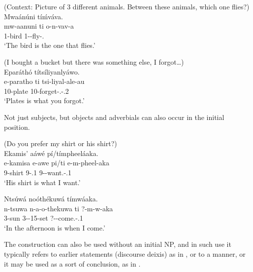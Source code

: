 \documentclass[output=paper]{langscibook}
\begin{document}
\ea
\label{bkm:Ref110413319}
(Context: Picture of 3 different animals. Between these animals, which one flies?)\\
Mwaánúni tí\'{m}váva.\\
\gll
mw-aanuni  ti  o-n-vav-a\\
1-bird  \COP{}  1{}-\PRS{}-fly-\FV{}.\REL{}\\
\glt
‘The bird is the one that flies.’\\


\z

\ea
\label{bkm:Ref110495426}
(I bought a bucket but there was something else, I forgot…)\\
Eparáthó títsíliyanlyáwo.\\
\gll
e-paratho  ti  tsi-liyal-ale-au\\
10-plate  \COP{}  10-forget-\PFV{}.\REL{}-\POSS{}.2\SG{}\\
\glt
‘Plates is what you forgot.’\\


\z

Not just subjects, but objects  and adverbials  can also occur in the initial position.


\ea
\label{bkm:Ref96779105}
(Do you prefer my shirt or his shirt?)\\
Ekamis' aáwé pí/tímpheeláaka.\\
\gll
e-kamisa  e-awe  pi/ti  e-m-pheel-aka\\
9-shirt  9-\POSS{}.1  \COP{}  9-\PRS{}-want.\REL{}-\POSS{}.1\SG{}\\
\glt
‘His shirt is what I want.’\\

  
\z

\ea
\label{bkm:Ref96779116}
Ntsúwá noóthékuwá tímwáaka.\\
\gll
n-tsuwa  n-a-o-thekuwa  ti  ?-m-w-aka\\
3-sun  3-\CONN{}-15-set  \COP{}  ?-\PRS{}-come.\REL{}-\POSS{}.1\SG{}\\
\glt
‘In the afternoon is when I come.’\\


\z

The construction can also be used without an initial NP, and in such use it typically refers to earlier statements (discourse deixis) as in , or to a manner, or it may be used as a sort of conclusion, as in .
\end{document}
